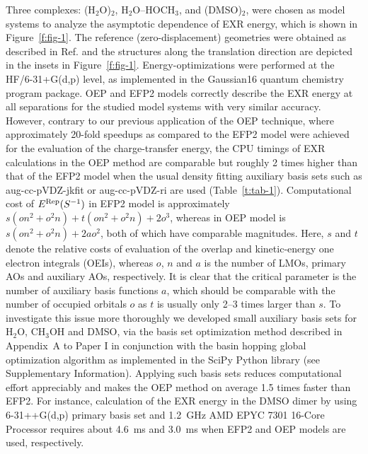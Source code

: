 \documentclass[aip,jcp,amsmath,amssymb,preprint,floatfix]{revtex4-1}
\begin{document}
Three complexes: 
(H$_2$O)$_2$, 
H$_2$O--HOCH$_3$, and
(DMSO)$_2$,
were chosen as model systems to analyze the asymptotic dependence 
of EXR energy, which is shown in Figure~\ref{f:fig-1}. 
The reference (zero\hyp{}displacement) geometries
were obtained as described in Ref.\cite{Blasiak.Bednarska.Choluj.Bartkowiak.JCP.2019} 
and the structures  
along the translation direction are depicted
in the insets in Figure~\ref{f:fig-1}.
Energy\hyp{}optimizations were performed at the HF/6-31+G(d,p) level,
as implemented in 
the {\sc Gaussian16} quantum chemistry program package.\cite{Gaussian16}
OEP and EFP2 models correctly describe the EXR energy at all separations
for the studied model systems with very similar accuracy. 
However,
contrary to our previous application of the OEP technique\cite{Blasiak.Bednarska.Choluj.Bartkowiak.JCP.2019},
where approximately 20\hyp{}fold speedups as compared to the EFP2 model were achieved
for the evaluation of the charge\hyp{}transfer energy,
the CPU timings of EXR calculations in the OEP method are comparable but roughly 2
times higher than that of the EFP2 model
when the usual density fitting auxiliary basis sets such as aug-cc-pVDZ-jkfit or aug-cc-pVDZ-ri are used
(Table~\ref{t:tab-1}).
Computational cost of $E^{\rm Rep}(S^{-1})$ in EFP2 model
is approximately $s(on^2 + o^2n) + t(on^2 + o^2n) + 2o^3$, whereas in OEP model
is $s(on^2 + o^2n) + 2ao^2$, both of which have comparable magnitudes. 
Here, $s$ and $t$ denote the relative costs of evaluation of the overlap
and kinetic-energy one electron integrals (OEIs), whereas $o$, $n$ and $a$ is
the number of LMOs, primary AOs and auxiliary AOs, respectively.
It is clear that the critical parameter is the number of auxiliary basis functions $a$,
which should be comparable with the number of occupied orbitals $o$ 
as $t$ is usually only 2--3 times larger than $s$.
To investigate this issue more thoroughly we developed small auxiliary basis sets for H$_2$O, CH$_3$OH and DMSO, 
via the basis set optimization method described in Appendix~A to Paper I
in conjunction with the basin hopping global optimization algorithm\cite{Wales.EnergyLandscapes.2003,
Wales.Scheraga.Science.1999,
Wales.Doye.JPCA.1997,Li.Scheraga.PNAS.1987}
as implemented in the SciPy Python library\cite{SciPy.2019}
(see Supplementary Information).
Applying such basis sets
reduces computational effort appreciably and makes the OEP method on average 1.5 times faster than EFP2.
For instance, calculation of the EXR energy in the DMSO dimer by using 6-31++G(d,p) primary
basis set and 
1.2~GHz AMD EPYC\texttrademark{} 7301 16-Core Processor
requires about 4.6~ms and 3.0~ms when EFP2 and OEP models are used, respectively.
\end{document}
